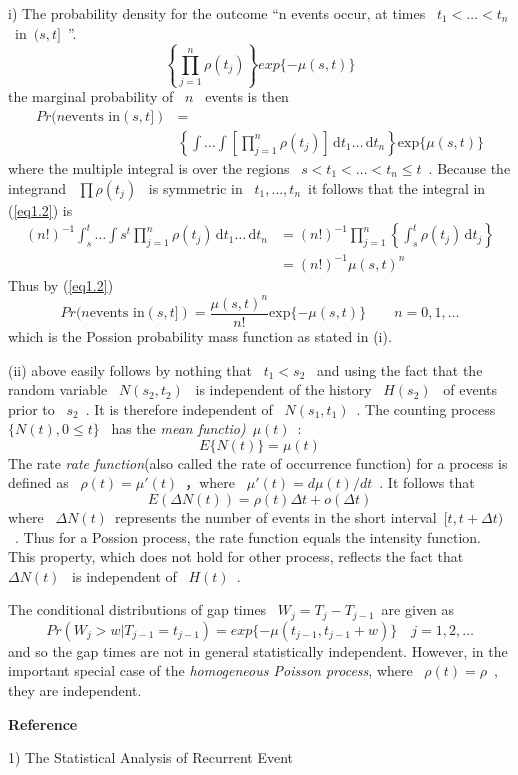 \documentclass{article}
\newcommand{\ud}{\,\mathrm{d}}
\begin{document}
i) The probability density for the outcome ``n events occur, at times ~$t_1<\dots<t_n$~in~$(s,t]$~''.
$$\left\{\prod_{j=1}^{n}\rho(t_j)\right\}exp\{-\mu(s,t)\}$$
the marginal probability of ~$n$~ events is then 
\begin{equation}\label{eq1.2}
\begin{aligned}
Pr(n \text{events in} (s,t])&=\\
							&\left\{\int\dots\int\left[\prod_{j=1}^{n}\rho(t_j)\right]\ud t_1\dots\ud t_n\right\}\text{exp}\{\mu(s,t)\}
\end{aligned}
\end{equation}
where the multiple integral is over the regions ~$s <t_1<\dots<t_n\leq t$~.
Because the integrand ~$\prod\rho(t_j)$~ is symmetric in ~$t_1,\dots,t_n$~it follows that the integral in (\ref{eq1.2}) is
\begin{equation*}
\begin{aligned}
(n!)^{-1}\int_{s}^t\dots\int{s}^t\prod_{j=1}^n\rho(t_j)\ud t_1\dots\ud t_n &=
(n!)^{-1}\prod_{j=1}^{n}\left\{\int_s^t\rho(t_j)\ud t_j\right\}\\
					&=(n!)^{-1}\mu(s,t)^n
\end{aligned}
\end{equation*}
Thus by (\ref{eq1.2})
\begin{equation}\label{eq1.3}
Pr(n \text{events in}(s,t]) = \frac{\mu(s,t)^n}{n!}\text{exp}\{-\mu(s,t)\}
	\qquad n=0,1,\dots
\end{equation}
which is the Possion probability mass function as stated in (i).

(ii) above easily follows by nothing that ~$t_1<s_2$~ and using the fact that the random variable ~$N(s_2, t_2)$~ is independent of the history ~$H(s_2)$~ of events prior to ~$s_2$~. It is therefore independent of ~$N(s_1, t_1)$~. The counting process ~$\{N(t), 0 \leq t\}$~ has the \textit{mean functio)}~$\mu(t)$~:
$$E\{N(t)\} = \mu(t)$$
The rate \textit{rate function}(also called the rate of occurrence function)
for a process is defined as ~$\rho(t)=\mu'(t)$~，where ~$\mu'(t)=d\mu(t)/dt$~. It follows that
$$E(\Delta N(t))=\rho(t)\Delta t + o(\Delta t)$$
where ~$\Delta N(t)$~represents the number of events in the short interval~$
[t, t+\Delta t)$~. Thus for a Possion process, the rate function equals the 
intensity function. This property, which does not hold for other process, reflects the fact that ~$\Delta N(t)$~ is independent of ~$H(t)$~.

The conditional distributions of gap times ~$W_j=T_j-T_{j-1}$~are given as
$$Pr(W_j>w|T_{j-1}=t_{j-1}) = exp\{-\mu(t_{j-1}, t_{j-1}+w)\}\quad j= 1,2,\dots$$
and so the gap times are not in general statistically independent. However, in the important special case of the \textit{homogeneous Poisson process}, where ~$\rho(t)=\rho$~, they are independent.

\textbf{Reference}

1) The Statistical Analysis of Recurrent Event
\end{document}
